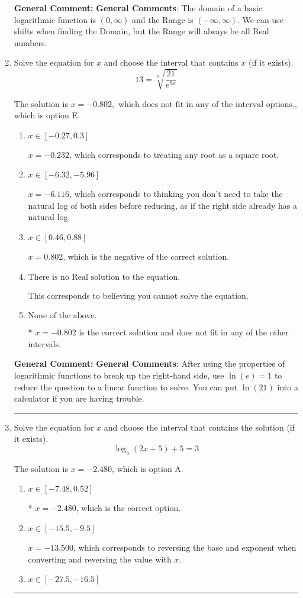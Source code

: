 \documentclass{extbook}[14pt]
\newcommand{\litem}[1]{\item #1

\rule{\textwidth}{0.4pt}}
\begin{document}
\begin{enumerate}
{\textbf{General Comment:} \textbf{General Comments}: The domain of a basic logarithmic function is $(0, \infty)$ and the Range is $(-\infty, \infty)$. We can use shifts when finding the Domain, but the Range will always be all Real numbers.
}
\litem{
 Solve the equation for $x$ and choose the interval that contains $x$ (if it exists).
\[  13 = \sqrt[4]{\frac{21}{e^{9x}}} \]

The solution is \( x = -0.802, \text{ which does not fit in any of the interval options.} \), which is option E.\begin{enumerate}[label=\Alph*.]
\item \( x \in [-0.27, 0.3] \)

$x = -0.232$, which corresponds to treating any root as a square root.
\item \( x \in [-6.32, -5.96] \)

$x = -6.116$, which corresponds to thinking you don't need to take the natural log of both sides before reducing, as if the right side already has a natural log.
\item \( x \in [0.46, 0.88] \)

$x = 0.802$, which is the negative of the correct solution.
\item \( \text{There is no Real solution to the equation.} \)

This corresponds to believing you cannot solve the equation.
\item \( \text{None of the above.} \)

* $x = -0.802$ is the correct solution and does not fit in any of the other intervals.
\end{enumerate}

\textbf{General Comment:} \textbf{General Comments}: After using the properties of logarithmic functions to break up the right-hand side, use $\ln(e) = 1$ to reduce the question to a linear function to solve. You can put $\ln(21)$ into a calculator if you are having trouble.
}
\litem{
Solve the equation for $x$ and choose the interval that contains the solution (if it exists).
\[ \log_{5}{(2x+5)}+5 = 3 \]

The solution is \( x = -2.480 \), which is option A.\begin{enumerate}[label=\Alph*.]
\item \( x \in [-7.48, 0.52] \)

* $x = -2.480$, which is the correct option.
\item \( x \in [-15.5, -9.5] \)

$x = -13.500$, which corresponds to reversing the base and exponent when converting and reversing the value with $x$.
\item \( x \in [-27.5, -16.5] \)


\end{enumerate}}
\end{enumerate}
\end{document}
